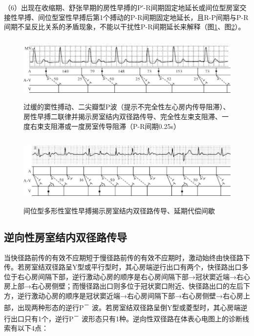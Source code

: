 （6）出现在收缩期、舒张早期的房性早搏的P′-R间期固定地延长或间位型房室交接性早搏、间位型室性早搏后第1个搏动的P-R间期固定地延长，且R-P间期与P-R间期不呈反比关系的矛盾现象，不能以干扰性P-R间期延长来解释（图\ref{fig25-12}、图\ref{fig25-13}）。

\begin{figure}[!htbp]
 \centering
 \includegraphics[width=5.76042in,height=1.3125in]{./images/Image00423.jpg}
 \captionsetup{justification=centering}
 \caption{过缓的窦性搏动、二尖瓣型P波（提示不完全性左心房内传导阻滞）、房性早搏二联律并揭示房室结内双径路传导、完全性左束支阻滞、一度右束支阻滞或一度房室传导阻滞（P-R间期0.25s）}
 \label{fig25-12}
  \end{figure} 

\begin{figure}[!htbp]
 \centering
 \includegraphics[width=5.82292in,height=1.40625in]{./images/Image00424.jpg}
 \captionsetup{justification=centering}
 \caption{间位型多形性室性早搏揭示房室结内双径路传导、延期代偿间歇}
 \label{fig25-13}
  \end{figure} 

\protect\hypertarget{text00032.htmlux5cux23subid383}{}{}

\subsection{逆向性房室结内双径路传导}

当快径路前传的有效不应期短于慢径路前传的有效不应期时，激动始终由快径路下传。若房室结双径路呈Y型或平行型时，其心房端逆行出口有两个，快径路出口多位于右心房间隔下部，逆行激动心房的顺序是右心房间隔下部→冠状窦近端→右心房上部→右心房侧壁；而慢径路出口则多位于冠状窦口附近、快径路出口的左后下方，逆行激动心房的顺序是冠状窦近端→右心房间隔下部→右心房侧壁→右心房上部，出现两种形态的逆行P\textsuperscript{－}
波。若房室结双径路呈倒Y型或菱型时，其心房端逆行出口只有1个，逆行P\textsuperscript{－}
波形态只有1种。逆向性双径路在体表心电图上的诊断线索有以下4点：

